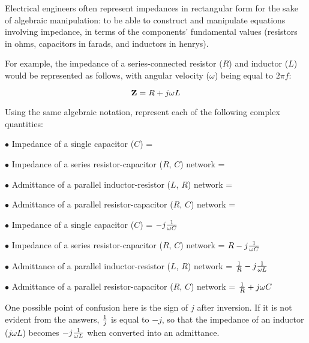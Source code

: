 

Electrical engineers often represent impedances in rectangular form for the sake of algebraic manipulation: to be able to construct and manipulate equations involving impedance, in terms of the components' fundamental values (resistors in ohms, capacitors in farads, and inductors in henrys).

For example, the impedance of a series-connected resistor ($R$) and inductor ($L$) would be represented as follows, with angular velocity ($\omega$) being equal to $2 \pi f$:

$${\bf Z} = R + j \omega L$$

Using the same algebraic notation, represent each of the following complex quantities:

\medskip
\goodbreak
\item{$\bullet$} Impedance of a single capacitor ($C$) = 
\item{$\bullet$} Impedance of a series resistor-capacitor ($R$, $C$) network =
\item{$\bullet$} Admittance of a parallel inductor-resistor ($L$, $R$) network =
\item{$\bullet$} Admittance of a parallel resistor-capacitor ($R$, $C$) network =
\medskip







\medskip
\goodbreak
\item{$\bullet$} Impedance of a single capacitor ($C$) = $-j {1 \over \omega C}$
\vskip 5pt
\item{$\bullet$} Impedance of a series resistor-capacitor ($R$, $C$) network = $R -j {1 \over \omega C}$
\vskip 5pt
\item{$\bullet$} Admittance of a parallel inductor-resistor ($L$, $R$) network = ${1 \over R} -j {1 \over \omega L}$
\vskip 5pt
\item{$\bullet$} Admittance of a parallel resistor-capacitor ($R$, $C$) network = ${1 \over R} +j \omega C$
\medskip







One possible point of confusion here is the sign of $j$ after inversion.  If it is not evident from the answers, ${1 \over j}$ is equal to $-j$, so that the impedance of an inductor ($j \omega L$) becomes $-j {1 \over {\omega L}}$ when converted into an admittance.




